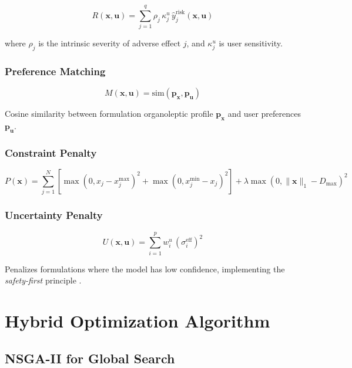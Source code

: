\documentclass[12pt, a4paper]{article}
\begin{document}
\begin{equation}
R(\mathbf{x}, \mathbf{u}) = \sum_{j=1}^q \rho_j \, \kappa_j^u \, \hat{y}_j^{\text{risk}}(\mathbf{x}, \mathbf{u})
\end{equation}

where $\rho_j$ is the intrinsic severity of adverse effect $j$, and $\kappa_j^u$ is user sensitivity.

\subsubsection{Preference Matching}

\begin{equation}
M(\mathbf{x}, \mathbf{u}) = \text{sim}(\mathbf{p}_{\mathbf{x}}, \mathbf{p}_{\mathbf{u}})
\end{equation}

Cosine similarity between formulation organoleptic profile $\mathbf{p}_{\mathbf{x}}$ and user preferences $\mathbf{p}_{\mathbf{u}}$.

\subsubsection{Constraint Penalty}

\begin{equation}
P(\mathbf{x}) = \sum_{j=1}^N \left[\max(0, x_j - x_j^{\max})^2 + \max(0, x_j^{\min} - x_j)^2\right] + \lambda \max(0, \|\mathbf{x}\|_1 - D_{\max})^2
\end{equation}

\subsubsection{Uncertainty Penalty}

\begin{equation}
U(\mathbf{x}, \mathbf{u}) = \sum_{i=1}^p w_i^u \, (\sigma_i^{\text{eff}})^2
\end{equation}

Penalizes formulations where the model has low confidence, implementing the \textit{safety-first} principle \citep{UQ2022}.

\section{Hybrid Optimization Algorithm}

\subsection{NSGA-II for Global Search}
\end{document}
